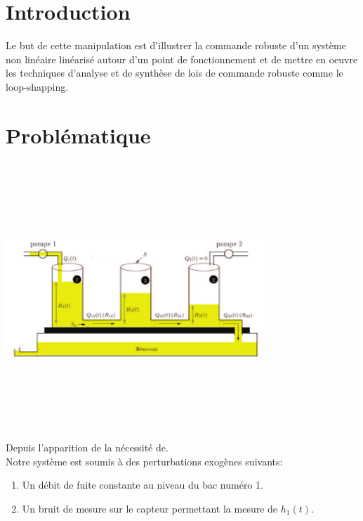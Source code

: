 \documentclass[12pt, a4paper, openany]{report}
\begin{document}
\chapter*{Introduction}
 
  Le but de cette manipulation est d'illustrer la commande robuste d'un système non linéaire linéarisé autour d'un point de fonctionnement et de mettre en oeuvre les techniques d'analyse et de synthèse de lois de commande robuste comme le loop-shapping.\\
                                                      



\chapter*{Problématique}
 
 \begin{center}
   \includegraphics[width=10cm,height=10cm,keepaspectratio]{index.png}
   \label{fig1}
 \end{center}   
   
   Depuis l’apparition de la nécessité de. \\
   
   Notre système est soumis à des perturbations exogènes suivants:
        
  \begin{enumerate}
      \item Un débit de fuite constante au niveau du bac numéro 1.
      \item Un bruit de mesure sur le capteur permettant la mesure de $h_{1}(t)$.
  \end{enumerate}
   
\end{document}
